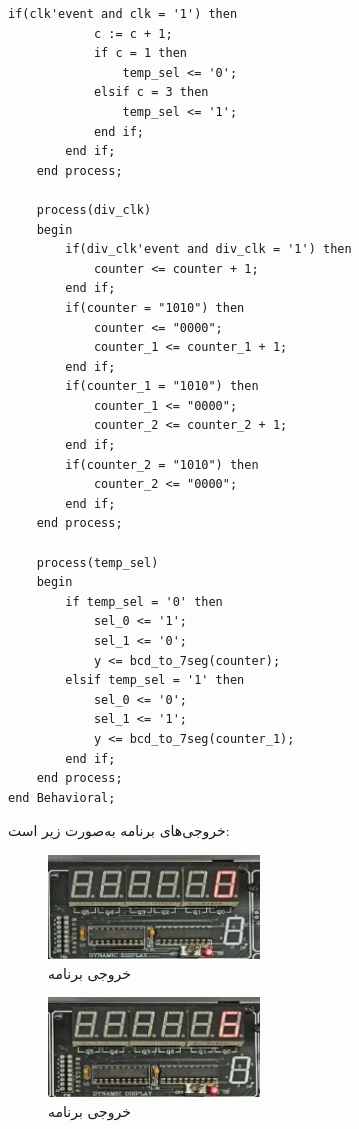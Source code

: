 \documentclass[12pt]{exam}
\begin{document}
\begin{questions}
\begin{latin}
\begin{lstlisting}[style=vhdl,caption={Sourse code}]
		if(clk'event and clk = '1') then
			c := c + 1;
			if c = 1 then
				temp_sel <= '0';
			elsif c = 3 then
				temp_sel <= '1';
			end if;
		end if;
	end process;  
	
	process(div_clk)
	begin
		if(div_clk'event and div_clk = '1') then
			counter <= counter + 1;
		end if;
		if(counter = "1010") then  
			counter <= "0000";
			counter_1 <= counter_1 + 1;		
		end if;
		if(counter_1 = "1010") then  
			counter_1 <= "0000";
			counter_2 <= counter_2 + 1;
		end if;
		if(counter_2 = "1010") then  
			counter_2 <= "0000";
		end if;
	end process;

	process(temp_sel)
	begin
		if temp_sel = '0' then
			sel_0 <= '1';
			sel_1 <= '0'; 
			y <= bcd_to_7seg(counter);
		elsif temp_sel = '1' then
			sel_0 <= '0';
			sel_1 <= '1';
			y <= bcd_to_7seg(counter_1);
		end if;
	end process;
end Behavioral;
\end{lstlisting}
\end{latin}

خروجی‌های برنامه به‌صورت زیر است: \\
\begin{figure}[h]
	\centering
	\includegraphics[width=0.5\textwidth]{images/result1}
	\caption{خروجی برنامه}
\end{figure}

\begin{figure}[h]
	\centering
	\includegraphics[width=0.5\textwidth]{images/result2}
	\caption{خروجی برنامه}
\end{figure}

\end{questions}
\end{document}
